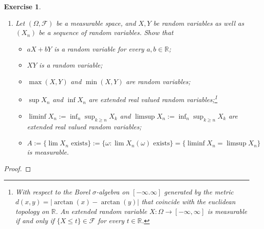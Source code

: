 \documentclass[DIV=classic,a4paper,10pt]{scrartcl}
\newtheorem{exercise}[theorem]{Exercise}
\theoremstyle{nonumberplain}
\newtheorem{proof}{Proof}
\numberwithin{equation}{section}
\begin{document}
\begin{exercise}
\begin{enumerate}[label=(\alph*), fullwidth]
        \item Let $(\Omega, \mathcal{F})$ be a measurable space, and $X,Y$ be random variables as well as $(X_n)$ be a sequence of random variables.
            Show that
            \begin{itemize}
                \item $aX+bY$ is a random variable for every $a,b \in \mathbb{R}$;
                \item $XY$ is a random variable;
                \item $\max(X,Y)$ and $\min(X,Y)$ are random variables;
                \item $\sup X_n$ and $\inf X_n$ are extended real valued random variables;\footnote{With respect to the Borel $\sigma$-algebra on $[-\infty.\infty]$ generated by the metric $d(x,y)=|\arctan(x)-\arctan(y)|$ that coincide with the euclidean topology on $\mathbb{R}$. An extended random variable $X:\Omega \to [-\infty,\infty]$ is measurable if and only if $\{X\leq t\} \in \mathcal{F}$ for every $t \in \mathbb{R}$.}
                \item $\liminf X_n:=\inf_n\sup_{k\geq n}X_k$ and $\limsup X_n:=\inf_n\sup_{k\geq n}X_k$ are extended real valued random variables;
                \item $A:=\{\lim X_n \text{ exists}\}:=\{\omega \colon \lim X_n(\omega)\text{ exists}\}=\{\liminf X_n=\limsup X_n\}$ is measurable.
            \end{itemize}
    \end{enumerate}
\end{exercise}
\begin{proof}
    
\end{proof}
\end{document}
